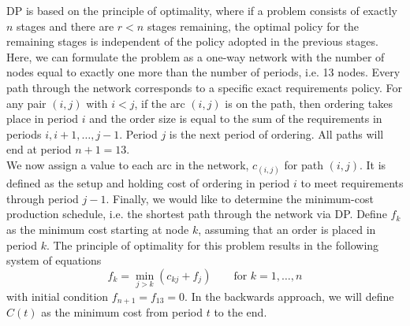 \documentclass[12pt]{article}
\begin{document}
\noindent DP is based on the principle of optimality, where if a problem consists of exactly $n$ stages and there are $r < n$ stages remaining, the optimal policy for the remaining stages is independent of the policy adopted in the previous stages. \\

\noindent Here, we can formulate the problem as a one-way network with the number of nodes equal to exactly one more than the number of periods, i.e. 13 nodes. Every path through the network corresponds to a specific exact requirements policy. For any pair $(i,j)$ with $i < j$, if the arc $(i,j)$ is on the path, then ordering takes place in period $i$ and the order size is equal to the sum of the requirements in periods $i, i +1, \dots , j-1$. Period $j$ is the next period of ordering. All paths will end at period $n+1 = 13$. \\ 

\noindent We now assign a value to each arc in the network, $c_{(i,j)}$ for path $(i,j)$. It is defined as the setup and holding cost of ordering in period $i$ to meet requirements through period $j-1$. Finally, we would like to determine the minimum-cost production schedule, i.e. the shortest path through the network via DP. Define $f_k$ as the minimum cost starting at node $k$, assuming that an order is placed in period $k$. The principle of optimality for this problem results in the following system of equations \begin{equation}
    f_k = \min_{j>k} (c_{kj} + f_j) \qquad \text{for } k = 1, \dots, n
\end{equation} with initial condition $f_{n+1} = f_{13} = 0$. In the backwards approach, we will define $C(t)$ as the minimum cost from period $t$ to the end.
\end{document}
